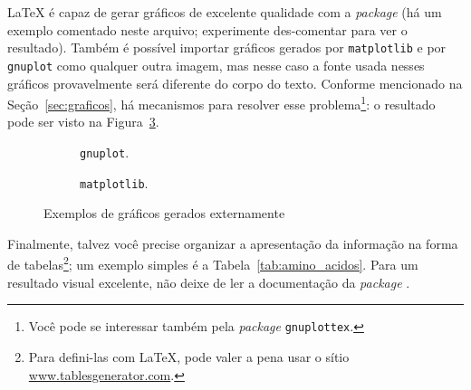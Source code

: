 
\LaTeX{} é capaz de gerar gráficos de excelente qualidade com a
\textit{package}  (há um exemplo comentado neste
arquivo; experimente des-comentar para ver o resultado). Também é
possível importar gráficos gerados por \texttt{matplotlib} e por
\texttt{gnuplot} como qualquer outra imagem, mas nesse caso a fonte
usada nesses gráficos provavelmente será diferente do corpo do texto.
Conforme mencionado na Seção~\ref{sec:graficos}, há mecanismos para
resolver esse problema\footnote{Você pode se interessar também pela
\textit{package} \texttt{gnuplottex}.}: o resultado pode ser visto
na Figura~\ref{fig:graficos}.

\begin{figure}
  \centering
  \begin{subfigure}[b]{.45\textwidth}
    \caption{\texttt{gnuplot}.\label{fig:gnuplot}}
  \end{subfigure}
  \begin{subfigure}[b]{.5\textwidth}
    
    \caption{\texttt{matplotlib}.\label{fig:matplotlib}}
  \end{subfigure}
  \caption{Exemplos de gráficos gerados externamente}\label{fig:graficos}
\end{figure}

Finalmente, talvez você precise organizar a apresentação da informação na forma de
tabelas\footnote{Para defini-las com \LaTeX{}, pode valer a pena usar o
sítio \url{www.tablesgenerator.com}.}; um exemplo simples é a Tabela~\ref{tab:amino_acidos}.
Para um resultado visual excelente, não deixe de ler a documentação da
\emph{package} .


